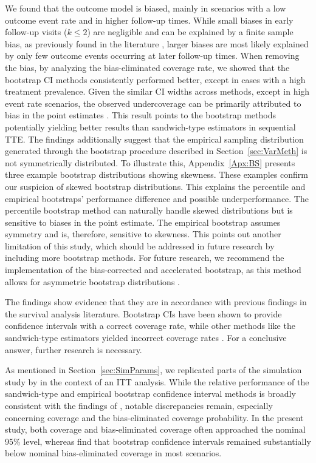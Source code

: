 \documentclass[pdflatex,sn-vancouver-ay]{sn-jnl}%
\theoremstyle{thmstyleone}%
\theoremstyle{thmstyletwo}%
\theoremstyle{thmstylethree}%
\begin{document}
We found that the outcome model is biased, mainly in scenarios with a low outcome event rate and in higher follow-up times. While small biases in early follow-up visits ($k \leq 2$) are negligible and can be explained by a finite sample bias, as previously found in the literature \citep{keoghSimulatingLongitudinalData2021}, larger biases are most likely explained by only few outcome events occurring at later follow-up times. When removing the bias, by analyzing the bias-eliminated coverage rate, we showed that the bootstrap CI methods consistently performed better, except in cases with a high treatment prevalence. Given the similar CI widths across methods, except in high event rate scenarios, the observed undercoverage can be primarily attributed to bias in the point estimates \citep{morrisUsingSimulationStudies2019a}. This result points to the bootstrap methods potentially yielding better results than sandwich-type estimators in sequential TTE. The findings additionally suggest that the empirical sampling distribution generated through the bootstrap procedure described in Section~\ref{sec:VarMeth} is not symmetrically distributed. To illustrate this, Appendix~\ref{Apx:BS} presents three example bootstrap distributions showing skewness. These examples confirm our suspicion of skewed bootstrap distributions. This explains the percentile and empirical bootstraps' performance difference and possible underperformance. The percentile bootstrap method can naturally handle skewed distributions but is sensitive to biases in the point estimate. The empirical bootstrap assumes symmetry and is, therefore, sensitive to skewness. This points out another limitation of this study, which should be addressed in future research by including more bootstrap methods. For future research, we recommend the implementation of the bias-corrected and accelerated bootstrap, as this method allows for asymmetric bootstrap distributions \citep{morrisUsingSimulationStudies2019a, leiEvaluationSeveralNonparametric2003}.

The findings show evidence that they are in accordance with previous findings in the survival analysis literature. Bootstrap CIs have been shown to provide confidence intervals with a correct coverage rate, while other methods like the sandwich-type estimators yielded incorrect coverage rates \citep{austinVarianceEstimationWhen2016}. For a conclusive answer, further research is necessary.

As mentioned in Section~\ref{sec:SimParams}, we replicated parts of the simulation study by \cite{limozinInferenceProceduresSequential2024} in the context of an ITT analysis. While the relative performance of the sandwich-type and empirical bootstrap confidence interval methods is broadly consistent with the findings of \citet{limozinInferenceProceduresSequential2024}, notable discrepancies remain, especially concerning coverage and the bias-eliminated coverage probability. In the present study, both coverage and bias-eliminated coverage often approached the nominal 95\% level, whereas \citet{limozinInferenceProceduresSequential2024} find that bootstrap confidence intervals remained substantially below nominal bias-eliminated coverage in most scenarios.
\end{document}
